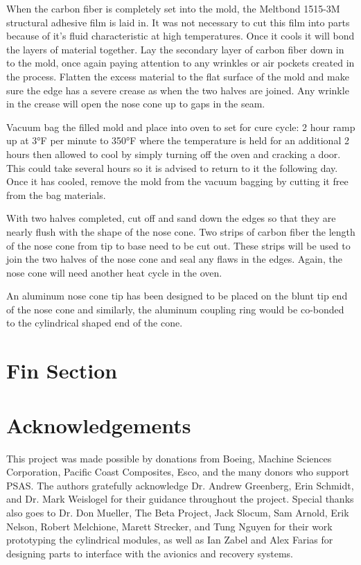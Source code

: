 \documentclass{aiaa-tc}%
\begin{document}
When the carbon fiber is completely set into the mold, the Meltbond 1515-3M structural adhesive film is laid in. It was not necessary to cut this film into parts because of it's fluid characteristic at high temperatures. Once it cools it will bond the layers of material together. Lay the secondary layer of carbon fiber down in to the mold, once again paying attention to any wrinkles or air pockets created in the process. Flatten the excess material to the flat surface of the mold and make sure the edge has a severe crease as when the two halves are joined. Any wrinkle in the crease will open the nose cone up to gaps in the seam.

Vacuum bag the filled mold and place into oven to set for cure cycle: 2 hour ramp up at 3°F per minute to 350°F where the temperature is held for an additional 2 hours then allowed to cool by simply turning off the oven and cracking a door. This could take several hours so it is advised to return to it the following day. Once it has cooled, remove the mold from the vacuum bagging by cutting it free from the bag materials. 

With two halves completed, cut off and sand down the edges so that they are nearly flush with the shape of the nose cone. Two strips of carbon fiber the length of the nose cone from tip to base need to be cut out. These strips will be used to join the two halves of the nose cone and seal any flaws in the edges. Again, the nose cone will need another heat cycle in the oven. 

An aluminum nose cone tip has been designed to be placed on the blunt tip end of the nose cone and similarly, the aluminum coupling ring would be co-bonded to the cylindrical shaped end of the cone. 

\section{Fin Section}

\section{Acknowledgements}

This project was made possible by donations from Boeing, Machine Sciences Corporation, Pacific Coast Composites, Esco, and the many donors who support PSAS.
The authors gratefully acknowledge Dr. Andrew Greenberg, Erin Schmidt, and Dr. Mark Weislogel for their guidance throughout the project.
Special thanks also goes to Dr. Don Mueller, The Beta Project, Jack Slocum, Sam Arnold, Erik Nelson, Robert Melchione, Marett Strecker, and Tung Nguyen for their work prototyping the cylindrical modules, as well as Ian Zabel and Alex Farias for designing parts to interface with the avionics and recovery systems.

\end{document}
